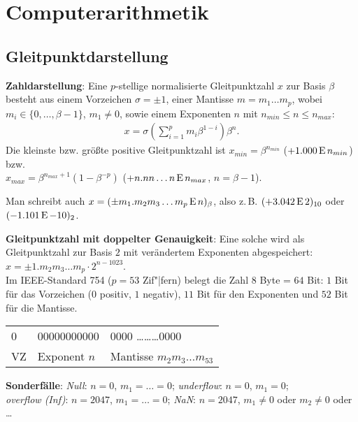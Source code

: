 \chapter{%
    Computerarithmetik%
}

\section{%
    Gleitpunktdarstellung%
}

\textbf{Zahldarstellung}:
Eine $p$-stellige normalisierte Gleitpunktzahl $x$ zur Basis $\beta$
besteht aus einem Vorzeichen $\sigma = \pm 1$,
einer Mantisse $m = m_1 \dotsc m_p$, wobei
$m_i \in \{0, \ldots, \beta - 1\}$, $m_1 \not= 0$,
sowie einem Exponenten $n$ mit $n_{min} \le n \le n_{max}$:
\begin{align*}
    x = \sigma \left(\sum_{i=1}^p m_i \beta^{1-i}\right) \beta^n.
\end{align*}
Die kleinste bzw. größte positive Gleitpunktzahl ist
$x_{min} = \beta^{n_{min}}$ ($+1.000 \operatorname{E} n_{min}$) bzw. \\
$x_{max} = \beta^{n_{max}+1} (1 - \beta^{-p})$
($+n.nn \dotsc n \operatorname{E} n_{max}$, $n = \beta - 1$).

Man schreibt auch $x = (\pm m_1 . m_2 m_3 \ldots m_p \operatorname{E} n)_\beta$,
also z.\,B. $(+3.042 \operatorname{E} 2)_{10}$ oder $(-1.101 \operatorname{E} -10)_2$.

\linie

\textbf{Gleitpunktzahl mit doppelter Genauigkeit}:
Eine solche wird als Gleitpunktzahl zur Basis $2$ mit verändertem Exponenten
abgespeichert: $x = \pm 1 . m_2 m_3 \ldots m_p \cdot 2^{n-1023}$. \\
Im IEEE-Standard 754 ($p = 53$ Zif"|fern) belegt die Zahl $8$ Byte = $64$ Bit:
$1$ Bit für das Vorzeichen ($0$ positiv, $1$ negativ),
$11$ Bit für den Exponenten und $52$ Bit für die Mantisse.

\begin{center}
    \begin{tabular}{l|l|l}
        0 & 00000000000 & 0000 \dots \dots \dots 0000 \\
        VZ & Exponent $n$ & Mantisse $m_2 m_3 \dotsc m_{53}$
    \end{tabular}
\end{center}

\textbf{Sonderfälle}: \qquad
\emph{Null}: $n = 0$, $m_1 = \ldots = 0$; \qquad
\emph{underflow}: $n = 0$, $m_1 = 0$; \\
\emph{overflow (Inf)}: $n = 2047$, $m_1 = \ldots = 0$; \qquad
\emph{NaN}: $n = 2047$, $m_1 \not= 0$ oder $m_2 \not= 0$ oder \ldots

